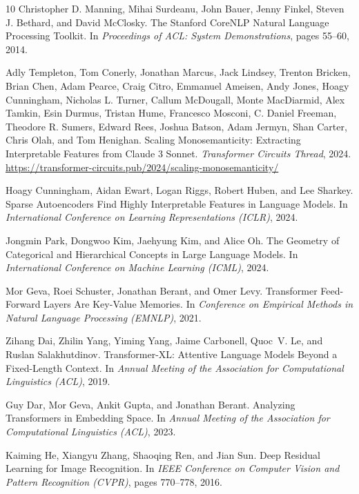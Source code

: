 \documentclass[11pt]{article}
\theoremstyle{definition}
\begin{document}
\begin{thebibliography}{10}
Christopher D. Manning, Mihai Surdeanu, John Bauer, Jenny Finkel, Steven J. Bethard, and David McClosky.
\newblock The Stanford CoreNLP Natural Language Processing Toolkit.
\newblock In \emph{Proceedings of ACL: System Demonstrations}, pages 55--60, 2014.

Adly Templeton, Tom Conerly, Jonathan Marcus, Jack Lindsey, Trenton Bricken, Brian Chen, Adam Pearce, Craig Citro, Emmanuel Ameisen, Andy Jones, Hoagy Cunningham, Nicholas L. Turner, Callum McDougall, Monte MacDiarmid, Alex Tamkin, Esin Durmus, Tristan Hume, Francesco Mosconi, C. Daniel Freeman, Theodore R. Sumers, Edward Rees, Joshua Batson, Adam Jermyn, Shan Carter, Chris Olah, and Tom Henighan.
\newblock Scaling Monosemanticity: Extracting Interpretable Features from Claude 3 Sonnet.
\newblock \emph{Transformer Circuits Thread}, 2024.
\newblock \url{https://transformer-circuits.pub/2024/scaling-monosemanticity/}

Hoagy Cunningham, Aidan Ewart, Logan Riggs, Robert Huben, and Lee Sharkey.
\newblock Sparse Autoencoders Find Highly Interpretable Features in Language Models.
\newblock In \emph{International Conference on Learning Representations (ICLR)}, 2024.

Jongmin Park, Dongwoo Kim, Jaehyung Kim, and Alice Oh.
\newblock The Geometry of Categorical and Hierarchical Concepts in Large Language Models.
\newblock In \emph{International Conference on Machine Learning (ICML)}, 2024.

Mor Geva, Roei Schuster, Jonathan Berant, and Omer Levy.
\newblock Transformer Feed-Forward Layers Are Key-Value Memories.
\newblock In \emph{Conference on Empirical Methods in Natural Language Processing (EMNLP)}, 2021.

Zihang Dai, Zhilin Yang, Yiming Yang, Jaime Carbonell, Quoc~V. Le, and Ruslan Salakhutdinov.
\newblock Transformer-XL: Attentive Language Models Beyond a Fixed-Length Context.
\newblock In \emph{Annual Meeting of the Association for Computational Linguistics (ACL)}, 2019.

Guy Dar, Mor Geva, Ankit Gupta, and Jonathan Berant.
\newblock Analyzing Transformers in Embedding Space.
\newblock In \emph{Annual Meeting of the Association for Computational Linguistics (ACL)}, 2023.

Kaiming He, Xiangyu Zhang, Shaoqing Ren, and Jian Sun.
\newblock Deep Residual Learning for Image Recognition.
\newblock In \emph{IEEE Conference on Computer Vision and Pattern Recognition (CVPR)}, pages 770--778, 2016.


\end{thebibliography}
\end{document}
